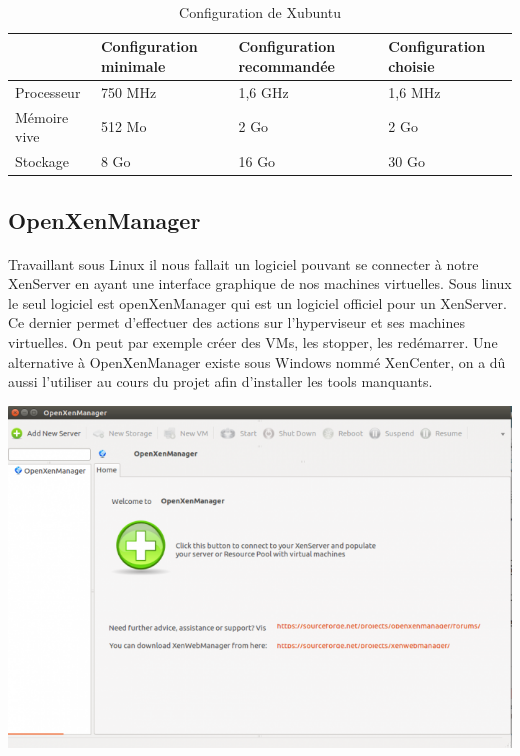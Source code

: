\documentclass[a4paper,12pt]{extarticle}
\begin{document}
\paragraph{\\}
\begin{table}[!h]
\begin{tabular}{|p{3cm}|p{3cm}|p{3cm}|p{3cm}|}

\hline
 & Configuration  minimale & Configuration recommandée & Configuration choisie\\
\hline 
Processeur & 750 MHz & 1,6 GHz & 1,6 MHz\\
\hline
Mémoire vive & 512 Mo & 2 Go & 2 Go \\
\hline
Stockage & 8 Go & 16 Go & 30 Go \\
\hline
\end{tabular}
\caption{Configuration de Xubuntu}
\end{table}

\subsection{OpenXenManager}

\paragraph{}
Travaillant sous Linux il nous fallait un logiciel pouvant se connecter à notre XenServer en ayant une interface graphique de nos machines virtuelles. Sous linux le seul logiciel est openXenManager qui est un logiciel officiel pour un XenServer. Ce dernier permet d’effectuer des actions sur l’hyperviseur et ses machines virtuelles. 
On peut par exemple créer des VMs, les stopper, les redémarrer. Une alternative à OpenXenManager existe sous Windows nommé XenCenter, on a dû aussi l’utiliser au cours du projet afin d’installer les tools manquants.

\begin{center}
\includegraphics[scale=0.70]{openxenmanager}
\end{center}
\end{document}
